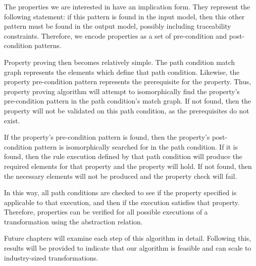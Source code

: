 The properties we are interested in have an implication form. They represent the
following statement: if this pattern is found in the input model, then
this other pattern must be found in the output model, possibly including traceability constraints. Therefore,
we encode properties as a set of pre-condition and post-condition patterns.

Property proving then becomes relatively simple. The path condition match graph
represents the elements which define that path condition. Likewise, the property
pre-condition pattern represents the prerequisite for the property. Thus,
property proving algorithm will attempt to isomorphically find the property's
pre-condition pattern in the path condition's match graph. If not found, then the
property will not be validated on this path condition, as the prerequisites do
not exist.

If the property's pre-condition pattern is found, then the property's
post-condition pattern is isomorphically searched for in the path condition. If
it is found, then the rule execution defined by that path condition will produce
the required elements for that property and the property will hold. If not
found, then the necessary elements will not be produced and the property check
will fail.

In this way, all path conditions are checked to see if the property specified is
applicable to that execution, and then if the execution satisfies that property.
Therefore, properties can be verified for all possible executions of a
transformation using the abstraction relation.

Future chapters will examine each step of this algorithm in detail. Following this, results will be provided to indicate that our algorithm is feasible and can scale to industry-sized transformations.